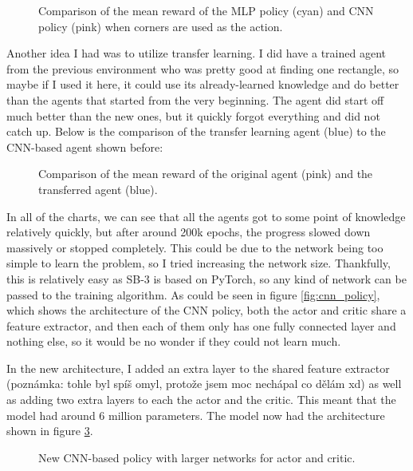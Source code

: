 \documentclass[
  digital,     %
  oneside,     %
  nosansbold,  %
  nocolorbold, %
  lof,         %
  lot,         %
]{fithesis4}
\begin{document}
\begin{figure}
    \centering
    \makebox[\textwidth][c]{}
    \caption{Comparison of the mean reward of the MLP policy (cyan) and CNN policy (pink) when corners are used as the action.}
    \label{fig:v3_corner}
\end{figure}

Another idea I had was to utilize transfer learning. I did have a trained agent from the previous environment who was pretty good at finding one rectangle, so maybe if I used it here, it could use its already-learned knowledge and do better than the agents that started from the very beginning. The agent did start off much better than the new ones, but it quickly forgot everything and did not catch up. Below is the comparison of the transfer learning agent (blue) to the CNN-based agent shown before:

\begin{figure}
    \centering
    \makebox[\textwidth][c]{}
    \caption{Comparison of the mean reward of the original agent (pink) and the transferred agent (blue).}
    \label{fig:v3_transfer}
\end{figure}

In all of the charts, we can see that all the agents got to some point of knowledge relatively quickly, but after around 200k epochs, the progress slowed down massively or stopped completely. This could be due to the network being too simple to learn the problem, so I tried increasing the network size. Thankfully, this is relatively easy as SB-3 is based on PyTorch, so any kind of network can be passed to the training algorithm. As could be seen in figure \ref{fig:cnn_policy}, which shows the architecture of the CNN policy, both the actor and critic share a feature extractor, and then each of them only has one fully connected layer and nothing else, so it would be no wonder if they could not learn much.

In the new architecture, I added an extra layer to the shared feature extractor (poznámka: tohle byl spíš omyl, protože jsem moc nechápal co dělám xd) as well as adding two extra layers to each the actor and the critic. This meant that the model had around 6 million parameters. The model now had the architecture shown in figure \ref{fig:bigger_net_policy}.

\begin{figure}
    \caption{New CNN-based policy with larger networks for actor and critic.}
    \label{fig:bigger_net_policy}
\end{figure}
\end{document}
